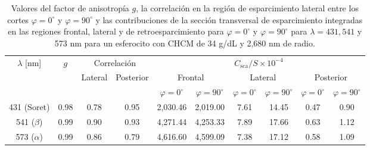 %
\begin{table}[h!]
	\setlength{\tabcolsep}{4pt}
	\begin{tabular}{cccccccccc}
		\hline
		\multirow{3}{*}{$\lambda$ [nm]} & \multirow{3}{*}{$g$} & \multicolumn{2}{c}{Correlación} & \multicolumn{6}{c}{$C_{\text{sca}}/S\times 10^{-4}$ } \\
		\cline{5-10}
		& & \multirow{2}{*}{Lateral} &  \multirow{2}{*}{Posterior}&  \multicolumn{2}{c}{Frontal} & \multicolumn{2}{c}{Lateral} & \multicolumn{2}{c}{Posterior}\\
		\cline{5-10}
		&  &  &  &  $\varphi=0^{\circ}$ & $\varphi=90^{\circ}$ &$\varphi=0^{\circ}$ & $\varphi=90^{\circ}$ &$\varphi=0^{\circ}$ & $\varphi=90^{\circ}$ \\ \hline
		431 (Soret) & 0.98  & 0.78 & 0.95 & 2,030.46 & 2,019.00 & 7.61 & 14.45 & 0.47 & 0.90  \\
		541 ($\beta$) & 0.99 & 0.90 & 0.93 & 4,271.44 & 4,253.33 & 7.89 & 17.66 & 0.63 & 1.12\\
		573 ($\alpha$) & 0.99 & 0.86 & 0.79 & 4,616.60 & 4,599.09 & 7.38 & 17.12 & 0.58 & 1.09\\
		\hline
	\end{tabular}
	\caption{Valores del factor de anisotropía $g$, la correlación en la región de esparcimiento lateral entre los cortes $\varphi=0^\circ$ y $\varphi=90^\circ$ y las contribuciones de la sección transversal de esparcimiento integradas en las regiones frontal, lateral y de retroesparcimiento para $\varphi=0^{\circ}$ y $\varphi=90^{\circ}$ para $\lambda=431,541$ y 573 nm para un esferocito con CHCM de 34 g/dL y 2,680 nm de radio. }
	\label{table:val_esf}
	\vspace{0.2cm} 
\end{table}
%
